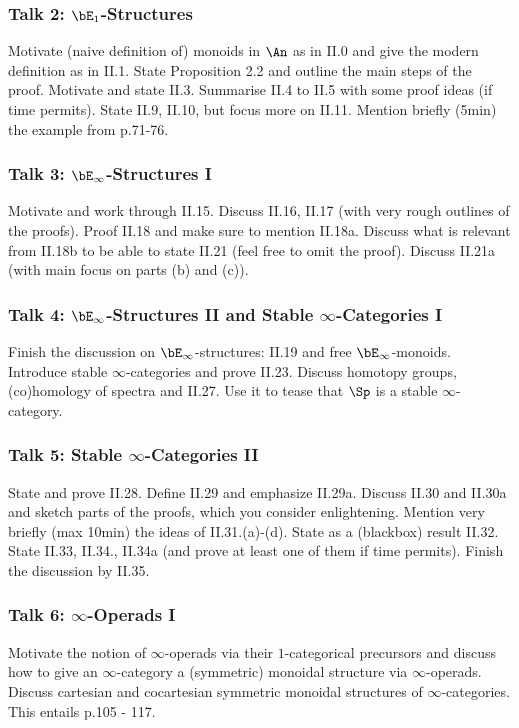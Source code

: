 \documentclass{article}
\begin{document}
\subsubsection*{Talk 2: $\bE_1$-Structures}
Motivate (naive definition of) monoids in $\An$ as in II.0 and
give the modern definition as in II.1. State Proposition 2.2 and 
outline the main steps of the proof.
Motivate and state II.3. Summarise II.4 to II.5 with some proof ideas
(if time permits). State II.9, II.10, but focus more on II.11.
Mention briefly (5min) the example from p.71-76.


\subsubsection*{Talk 3: $\bE_\infty$-Structures I}
Motivate and work through II.15. Discuss II.16, II.17 (with very rough outlines
of the proofs). Proof II.18 and make sure to mention II.18a.
Discuss what is relevant from II.18b to be able to state II.21
(feel free to omit the proof). Discuss II.21a (with main focus on parts 
(b) and (c)).

\subsubsection*{Talk 4: $\bE_\infty$-Structures II and 
Stable $\infty$-Categories I}
Finish the discussion on $\bE_\infty$-structures: II.19 and free 
$\bE_\infty$-monoids.
Introduce stable $\infty$-categories and prove II.23. Discuss
homotopy groups, (co)homology of spectra and II.27. Use it to 
tease that $\Sp$ is a stable $\infty$-category.

\subsubsection*{Talk 5: Stable $\infty$-Categories II}
State and prove II.28. Define II.29 and emphasize II.29a.
Discuss II.30 and II.30a and sketch parts of the proofs, which you consider
enlightening. Mention very briefly (max 10min) the ideas of II.31.(a)-(d).
State as a (blackbox) result II.32. State II.33, II.34., II.34a 
(and prove at least one of them if time permits).
Finish the discussion by II.35.

\subsubsection*{Talk 6: $\infty$-Operads I}
Motivate the notion of $\infty$-operads via their $1$-categorical 
precursors and discuss how to give an $\infty$-category a 
(symmetric) monoidal structure via $\infty$-operads. Discuss 
cartesian and cocartesian symmetric monoidal structures of
$\infty$-categories. This entails p.105 - 117.
\end{document}

